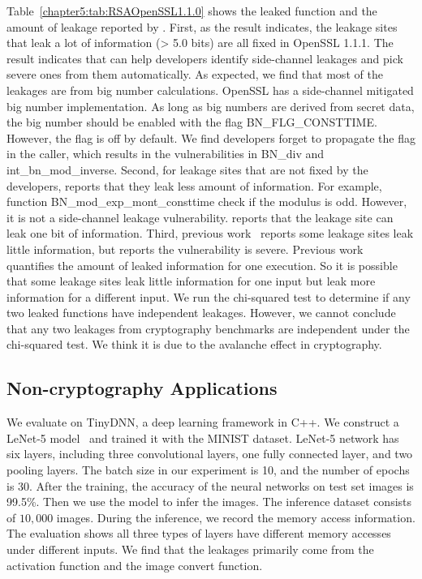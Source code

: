Table~\ref{chapter5:tab:RSAOpenSSL1.1.0} shows the leaked function and the amount of leakage reported by \ctool{}. First, as the result indicates, the leakage sites that leak a lot of information (> 5.0 bits) are all fixed in OpenSSL 1.1.1. The result indicates that \ctool{} can help developers identify side-channel leakages and pick severe ones from them automatically. As expected, we find that most of the leakages are from big number calculations. OpenSSL has a side-channel mitigated big number implementation. As long as big numbers are derived from secret data, the big number should be enabled with the flag \textsf{BN\_FLG\_CONSTTIME}. However, the flag is off by default. We find developers forget to propagate the flag in the caller, which results in the vulnerabilities in \textsf{BN\_div} and \textsf{int\_bn\_mod\_inverse}. Second, for leakage sites that are not fixed by the developers, \ctool{} reports that they leak less amount of information. For example, function \textsf{BN\_mod\_exp\_mont\_consttime} check if the modulus is odd. However, it is not a side-channel leakage vulnerability. \ctool{} reports that the leakage site can leak one bit of information. Third, previous work~\cite{bao2021abacus} reports some leakage sites leak little information, but \ctool{} reports the vulnerability is severe. Previous work \tool{}~\cite{bao2021abacus} quantifies the amount of leaked information for one execution. So it is possible that some leakage sites leak little information for one input but leak more information for a different input. We run the chi-squared test to determine if any two leaked functions have independent leakages. However, we cannot conclude that any two leakages from cryptography benchmarks are independent under the chi-squared test. We think it is due to the avalanche effect in cryptography.

\subsection{Non-cryptography Applications}



We evaluate \ctool{} on TinyDNN, a deep learning framework in C++. We
construct a LeNet-5 model~\cite{lecun1998gradient} and trained it with
the MINIST dataset. LeNet-5 network has six layers, including three
convolutional layers, one fully connected layer, and two pooling
layers. The batch size in our experiment is 10, and the number of
epochs is 30. After the training, the accuracy of the neural networks
on test set images is 99.5\%. Then we use the model to infer the
images. The inference dataset consists of $10,000$ images.  During the
inference, we record the memory access information. The evaluation
shows all three types of layers have different memory accesses under
different inputs. We find that the leakages primarily come from the
activation function and the image convert function.
